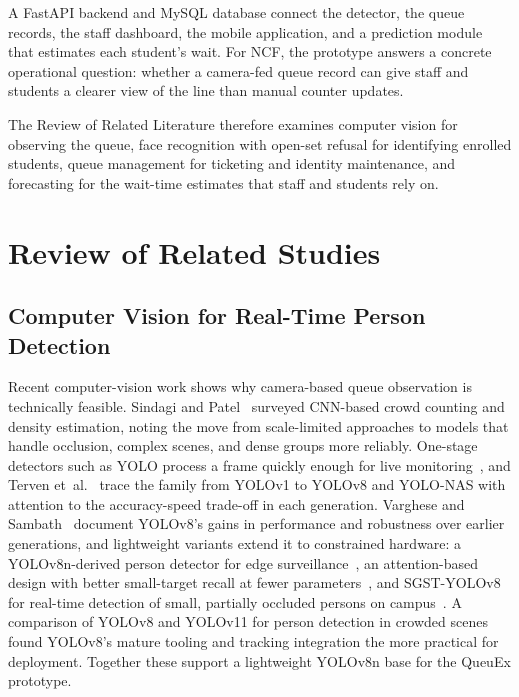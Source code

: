 \documentclass{research}
\newcommand{\sysname}{QueuEx}
\begin{document}
A FastAPI backend and MySQL database connect the detector, the queue
records, the staff dashboard, the mobile application, and a prediction
module that estimates each student's wait. For NCF, the prototype
answers a concrete operational question: whether a camera-fed queue
record can give staff and students a clearer view of the line than
manual counter updates.

The Review of Related Literature therefore examines computer vision for
observing the queue, face recognition with open-set refusal for
identifying enrolled students, queue management for ticketing and
identity maintenance, and forecasting for the wait-time estimates that
staff and students rely on.

\section{Review of Related Studies}
\label{cr:rrl}

\subsection{Computer Vision for Real-Time Person Detection}
Recent computer-vision work shows why camera-based queue observation is
technically feasible. Sindagi and Patel~\cite{sindagi2018survey}
surveyed CNN-based crowd counting and density estimation, noting the
move from scale-limited approaches to models that handle occlusion,
complex scenes, and dense groups more reliably. One-stage detectors
such as YOLO process a frame quickly enough for live
monitoring~\cite{redmon2018}, and Terven et~al.~\cite{terven2023yolo}
trace the family from YOLOv1 to YOLOv8 and YOLO-NAS with attention to
the accuracy-speed trade-off in each generation. Varghese and
Sambath~\cite{rrlcomp092yolov8novelobject} document YOLOv8's gains in
performance and robustness over earlier generations, and lightweight
variants extend it to constrained hardware: a YOLOv8n-derived person
detector for edge surveillance~\cite{wang2025lightweight}, an
attention-based design with better small-target recall at fewer
parameters~\cite{rrlcomp091improvedyolov8lightweight}, and SGST-YOLOv8
for real-time detection of small, partially occluded persons on
campus~\cite{rrlcomp016sgstyolov8improved}. A comparison of YOLOv8 and
YOLOv11 for person detection in crowded
scenes~\cite{rrlcomp019evaluatingyolov8yolov11} found YOLOv8's mature
tooling and tracking integration the more practical for deployment.
Together these support a lightweight YOLOv8n base for the \sysname{}
prototype.
\end{document}
